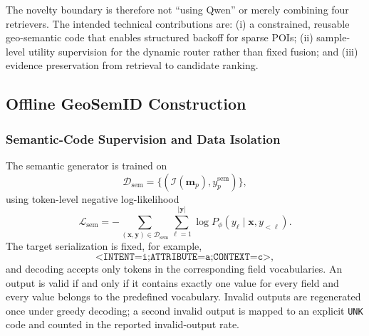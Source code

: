\documentclass[journal]{IEEEtran}
\begin{document}
The novelty boundary is therefore not ``using Qwen'' or merely combining four
retrievers.
The intended technical contributions are:
(i) a constrained, reusable geo-semantic code that enables structured backoff
for sparse POIs;
(ii) sample-level utility supervision for the dynamic router rather than
fixed fusion; and
(iii) evidence preservation from retrieval to candidate ranking.

\subsection{Offline GeoSemID Construction}
\label{subsec:geosemid}

\subsubsection{Semantic-Code Supervision and Data Isolation}

The semantic generator is trained on
\begin{equation}
\mathcal{D}_{\mathrm{sem}}
=
\{
(\mathcal{I}(\bm{m}_p),y_p^{\mathrm{sem}})
\},
\label{eq:semantic_dataset}
\end{equation}
using token-level negative log-likelihood
\begin{equation}
\mathcal{L}_{\mathrm{sem}}
=
-
\sum_{(\bm{x},\bm{y})\in\mathcal{D}_{\mathrm{sem}}}
\sum_{\ell=1}^{|\bm{y}|}
\log P_{\phi}(y_{\ell}\mid\bm{x},y_{<\ell}).
\label{eq:semantic_loss}
\end{equation}
The target serialization is fixed, for example,
\begin{equation}
\texttt{<INTENT=i;ATTRIBUTE=a;CONTEXT=c>},
\label{eq:serialization_example}
\end{equation}
and decoding accepts only tokens in the corresponding field vocabularies.
An output is valid if and only if it contains exactly one value for every
field and every value belongs to the predefined vocabulary.
Invalid outputs are regenerated once under greedy decoding; a second invalid
output is mapped to an explicit \texttt{UNK} code and counted in the reported
invalid-output rate.
\end{document}
